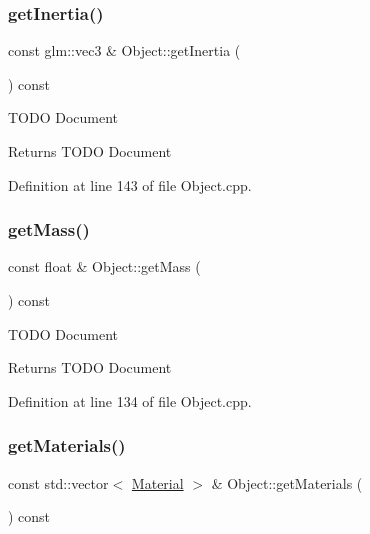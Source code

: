 \mbox{\label{class_object_a2d23e6dad9e8c355dda6b3f466d202f3}} 
\subsubsection{\texorpdfstring{get\+Inertia()}{getInertia()}}
{\footnotesize\ttfamily const glm\+::vec3 \& Object\+::get\+Inertia (\begin{DoxyParamCaption}{ }\end{DoxyParamCaption}) const}

T\+O\+DO Document \begin{DoxyReturn}{Returns}
T\+O\+DO Document 
\end{DoxyReturn}


Definition at line 143 of file Object.\+cpp.

\mbox{\label{class_object_a334afec6a91a5c6473d75858771597a2}} 
\subsubsection{\texorpdfstring{get\+Mass()}{getMass()}}
{\footnotesize\ttfamily const float \& Object\+::get\+Mass (\begin{DoxyParamCaption}{ }\end{DoxyParamCaption}) const}

T\+O\+DO Document \begin{DoxyReturn}{Returns}
T\+O\+DO Document 
\end{DoxyReturn}


Definition at line 134 of file Object.\+cpp.

\mbox{\label{class_object_a69844ac34730373cb824a608727fa6ff}} 
\subsubsection{\texorpdfstring{get\+Materials()}{getMaterials()}}
{\footnotesize\ttfamily const std\+::vector$<$ \hyperlink{class_material}{Material} $>$ \& Object\+::get\+Materials (\begin{DoxyParamCaption}{ }\end{DoxyParamCaption}) const}

